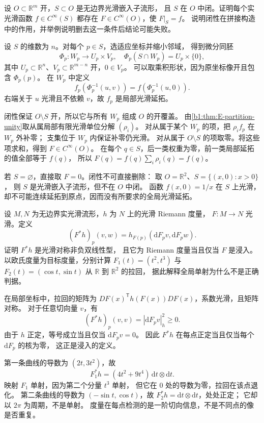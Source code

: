 \begin{exercise}\label{b1:ex:E-submanifold-extension}
设 \(O\subset\mathbb R^m\) 开，\(S\subset O\) 是无边界光滑嵌入子流形，
且 \(S\) 在 \(O\) 中闭。证明每个实光滑函数 \(f\in C^\infty(S)\)
都存在 \(F\in C^\infty(O)\)，使 \(F|_S=f\)。
说明闭性在拼接构造中的作用，并举例说明删去这一条件后结论可能失败。
\end{exercise}
\begin{solution}
设 \(S\) 的维数为 \(n\)。对每个 \(p\in S\)，选适应坐标并缩小邻域，
得到微分同胚
\[
 \Phi_p:W_p\longrightarrow U_p\times V_p,
 \quad \Phi_p(S\cap W_p)=U_p\times\{0\},
\]
其中 \(U_p\subset\mathbb R^n\)、\(V_p\subset\mathbb R^{m-n}\) 开，\(0\in V_p\)。
可以取乘积形状，因为原坐标像开且包含 \(\Phi_p(p)\)。
在 \(W_p\) 中定义
\[
 f_p(\Phi_p^{-1}(u,v))=f(\Phi_p^{-1}(u,0)).
\]
右端关于 \(u\) 光滑且不依赖 \(v\)，故 \(f_p\) 是局部光滑延拓。

闭性保证 \(O\setminus S\) 开，所以它与所有 \(W_p\) 组成 \(O\) 的开覆盖。
由\cref{b1:thm:E-partition-unity}取从属局部有限光滑单位分解 \((\rho_i)\)。
对从属于某个 \(W_p\) 的项，把 \(\rho_i f_p\) 在 \(W_p\) 外补零；
支集位于 \(W_p\) 内保证补零仍光滑。
对从属于 \(O\setminus S\) 的项取零。将这些项求和，得到 \(F\in C^\infty(O)\)。
在每个 \(q\in S\)，后一类权重为零，前一类局部延拓的值全部等于 \(f(q)\)，
所以 \(F(q)=f(q)\sum_i\rho_i(q)=f(q)\)。

若 \(S=\varnothing\)，直接取 \(F=0\)。闭性不可直接删除：
取 \(O=\mathbb R^2\)、\(S=\{(x,0):x>0\}\)，
则 \(S\) 是光滑嵌入子流形，但不在 \(O\) 中闭。
函数 \(f(x,0)=1/x\) 在 \(S\) 上光滑，
却不可能连续延拓到原点，因而没有所要求的全局光滑延拓。
\end{solution}

\begin{exercise}\label{b1:ex:E-pullback-metric}
设 \(M,N\) 为无边界实光滑流形，\(h\) 为 \(N\) 上的光滑 Riemann 度量，
\(F:M\to N\) 光滑。定义
\[
 (F^*h)_p(v,w)=h_{F(p)}(\mathrm dF_pv,\mathrm dF_pw).
\]
证明 \(F^*h\) 是光滑对称非负双线性型，
且它为 Riemann 度量当且仅当 \(F\) 是浸入。
以欧氏度量为目标度量，分别计算
\(F_1(t)=(t^2,t^3)\) 与 \(F_2(t)=(\cos t,\sin t)\)
从 \(\mathbb R\) 到 \(\mathbb R^2\) 的拉回，
据此解释全局单射为什么不是正确判据。
\end{exercise}
\begin{solution}
在局部坐标中，拉回的矩阵为
\(DF(x)^{\mathsf T}h(F(x))DF(x)\)，系数光滑，且矩阵对称。
对于任意切向量 \(v\)，有
\[
 (F^*h)_p(v,v)=|\mathrm dF_pv|_h^2\geq0.
\]
由于 \(h\) 正定，等号成立当且仅当 \(\mathrm dF_pv=0\)。
因此 \(F^*h\) 在每点正定当且仅当每个 \(\mathrm dF_p\) 的核为零，
这正是浸入的定义。

第一条曲线的导数为 \((2t,3t^2)\)，故
\[
 F_1^*h=(4t^2+9t^4)\,\mathrm dt\otimes\mathrm dt.
\]
映射 \(F_1\) 单射，因为第二个分量 \(t^3\) 单射，
但它在 \(0\) 处的导数为零，拉回在该点退化。
第二条曲线的导数为 \((-\sin t,\cos t)\)，故
\(F_2^*h=\mathrm dt\otimes\mathrm dt\)，处处正定；
它却以 \(2\pi\) 为周期，不是单射。
度量在每点检测的是一阶切向信息，不是不同点的像是否重复。
\end{solution}

